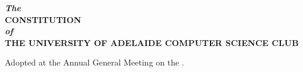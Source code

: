 \begin{titlepage}
    \begin{center}
        \vspace{1cm}
        \LARGE\textbf{\textit{The}} \\
        \huge\textbf{CONSTITUTION} \\
        \LARGE\textbf{\textit{of}} \\
        \huge\textbf{THE UNIVERSITY OF ADELAIDE COMPUTER SCIENCE CLUB}

        \vfill
        
        \vfill

        \Large
        Adopted at the Annual General Meeting on the \adoptedLongDate.
    \end{center}
\end{titlepage}
